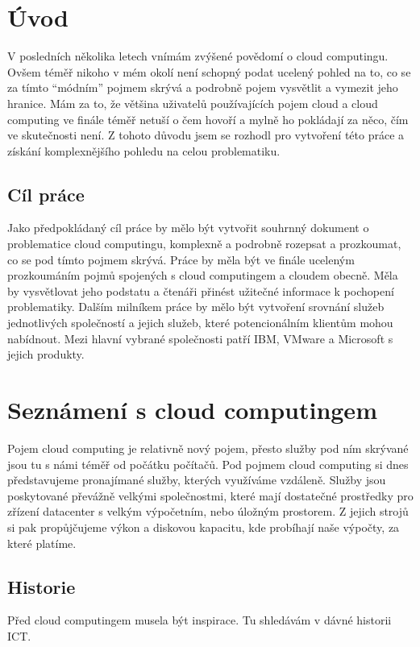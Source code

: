 \section{Úvod}
V posledních několika letech vnímám zvýšené povědomí o cloud computingu. Ovšem téměř nikoho v mém  okolí není schopný podat ucelený pohled na to, co se za tímto "`módním"' pojmem skrývá a podrobně pojem vysvětlit a vymezit jeho hranice. Mám za to, že většina uživatelů používajících pojem cloud a cloud computing ve finále téměř netuší o čem hovoří a mylně ho pokládají za něco, čím ve skutečnosti není. Z tohoto důvodu jsem se rozhodl pro vytvoření této práce a získání komplexnějšího pohledu na celou problematiku.

\subsection{Cíl práce}
Jako předpokládaný cíl práce by mělo být vytvořit souhrnný dokument o problematice cloud computingu, komplexně a podrobně rozepsat a prozkoumat, co se pod tímto pojmem skrývá. Práce by měla být ve finále uceleným prozkoumáním pojmů spojených s cloud computingem a cloudem obecně. Měla by vysvětlovat jeho podstatu a čtenáři přinést užitečné informace k pochopení problematiky. Dalším milníkem práce by mělo být vytvoření srovnání služeb jednotlivých společností a jejich služeb, které potencionálním klientům mohou nabídnout. Mezi hlavní vybrané společnosti patří IBM, VMware a Microsoft s jejich produkty.

\section{Seznámení s cloud computingem}
Pojem cloud computing je relativně nový pojem, přesto služby pod ním skrývané jsou tu s námi téměř od počátku počítačů. Pod pojmem cloud computing si dnes představujeme pronajímané služby, kterých využíváme vzdáleně. Služby jsou poskytované převážně velkými společnostmi, které mají dostatečné prostředky pro zřízení datacenter s velkým výpočetním, nebo úložným prostorem. Z jejich strojů si pak propůjčujeme výkon a diskovou kapacitu, kde probíhají naše výpočty, za které platíme.

\subsection{Historie}
Před cloud computingem musela být inspirace. Tu shledávám v dávné historii ICT.


